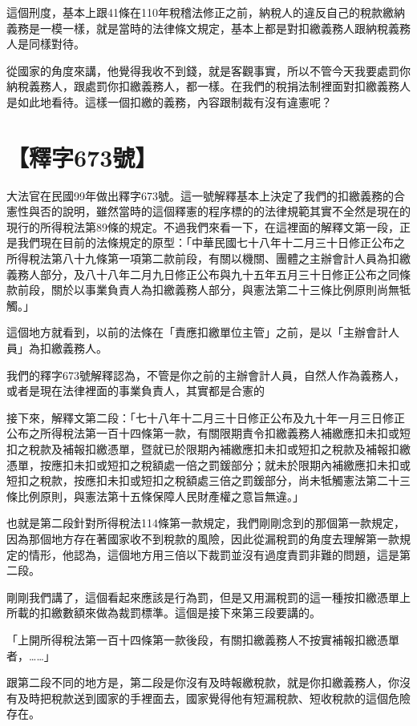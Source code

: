 \documentclass[]{ctexbook}
\begin{document}
這個刑度，基本上跟41條在110年稅稽法修正之前，納稅人的違反自己的稅款繳納義務是一模一樣，就是當時的法律條文規定，基本上都是對扣繳義務人跟納稅義務人是同樣對待。

從國家的角度來講，他覺得我收不到錢，就是客觀事實，所以不管今天我要處罰你納稅義務人，跟處罰你扣繳義務人，都一樣。在我們的稅捐法制裡面對扣繳義務人是如此地看待。這樣一個扣繳的義務，內容跟制裁有沒有違憲呢？

\hypertarget{ux91cbux5b57673ux865f}{%
\section{【釋字673號】}\label{ux91cbux5b57673ux865f}}

大法官在民國99年做出釋字673號。這一號解釋基本上決定了我們的扣繳義務的合憲性與否的說明，雖然當時的這個釋憲的程序標的的法律規範其實不全然是現在的現行的所得稅法第89條的規定。不過我們來看一下，在這裡面的解釋文第一段，正是我們現在目前的法條規定的原型：「中華民國七十八年十二月三十日修正公布之所得稅法第八十九條第一項第二款前段，有關以機關、團體之主辦會計人員為扣繳義務人部分，及八十八年二月九日修正公布與九十五年五月三十日修正公布之同條款前段，關於以事業負責人為扣繳義務人部分，與憲法第二十三條比例原則尚無牴觸。」

這個地方就看到，以前的法條在「責應扣繳單位主管」之前，是以「主辦會計人員」為扣繳義務人。

我們的釋字673號解釋認為，不管是你之前的主辦會計人員，自然人作為義務人，或者是現在法律裡面的事業負責人，其實都是合憲的

接下來，解釋文第二段：「七十八年十二月三十日修正公布及九十年一月三日修正公布之所得稅法第一百十四條第一款，有關限期責令扣繳義務人補繳應扣未扣或短扣之稅款及補報扣繳憑單，暨就已於限期內補繳應扣未扣或短扣之稅款及補報扣繳憑單，按應扣未扣或短扣之稅額處一倍之罰鍰部分；就未於限期內補繳應扣未扣或短扣之稅款，按應扣未扣或短扣之稅額處三倍之罰鍰部分，尚未牴觸憲法第二十三條比例原則，與憲法第十五條保障人民財產權之意旨無違。」

也就是第二段針對所得稅法114條第一款規定，我們剛剛念到的那個第一款規定，因為那個地方存在著國家收不到稅款的風險，因此從漏稅罰的角度去理解第一款規定的情形，他認為，這個地方用三倍以下裁罰並沒有過度責罰非難的問題，這是第二段。

剛剛我們講了，這個看起來應該是行為罰，但是又用漏稅罰的這一種按扣繳憑單上所載的扣繳數額來做為裁罰標準。這個是接下來第三段要講的。

「上開所得稅法第一百十四條第一款後段，有關扣繳義務人不按實補報扣繳憑單者，\ldots\ldots」

跟第二段不同的地方是，第二段是你沒有及時報繳稅款，就是你扣繳義務人，你沒有及時把稅款送到國家的手裡面去，國家覺得他有短漏稅款、短收稅款的這個危險存在。
\end{document}
